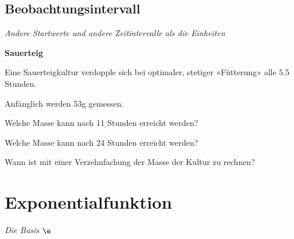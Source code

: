 






\subsection{Beobachtungsintervall}
\textit{Andere Startwerte und andere Zeitintervalle als die Einheiten}



\bbwActAufgabenNr{} \textbf{Sauerteig}

Eine Sauerteigkultur verdopple sich bei optimaler, stetiger «Fütterung» alle 5.5 Stunden.

Anfänglich werden 53g gemessen.

\begin{bbwAufgabenBlock}

\item Welche Masse kann nach 11 Stunden erreicht werden?

\item Welche Masse kann nach 24 Stunden erreicht werden?

\item Wann ist mit einer Verzehnfachung der Masse der Kultur zu rechnen?


\end{bbwAufgabenBlock}
\platzFuerBerechnungenBisEndeSeite{}






\section{Exponentialfunktion}
\textit{Die Basis $\e$}

